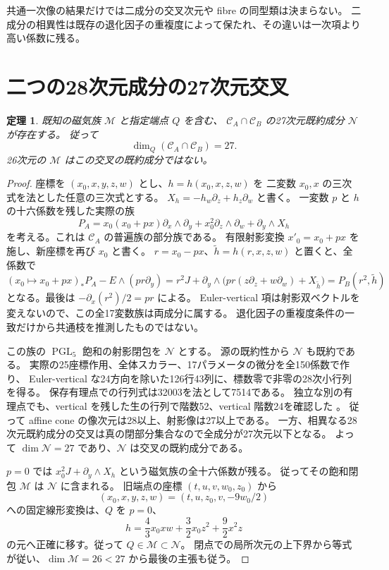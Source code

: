 \documentclass[11pt,a4paper]{ltjsarticle}
\DeclareMathOperator{\PGL}{PGL}
\newtheorem{theorem}{定理}[section]
\theoremstyle{remark}
\begin{document}
共通一次像の結果だけでは二成分の交叉次元や fibre の同型類は決まらない。
二成分の相異性は既存の退化因子の重複度によって保たれ、その違いは一次項より高い係数に残る。

\section{二つの28次元成分の27次元交叉}\label{sec:ambient-intersection27}

\begin{theorem}\label{thm:ambient-intersection27}
既知の磁気族 $\mathcal M$ と指定端点 $Q$ を含む、
$\mathcal C_A\cap\mathcal C_B$ の27次元既約成分 $\mathcal N$ が存在する。
従って
\[
 \dim_Q(\mathcal C_A\cap\mathcal C_B)=27.
\]
26次元の $\mathcal M$ はこの交叉の既約成分ではない。
\end{theorem}
\begin{proof}
座標を $(x_0,x,y,z,w)$ とし、$h=h(x_0,x,z,w)$ を
二変数 $x_0,x$ の三次式を法とした任意の三次式とする。
$X_h=-h_w\partial_z+h_z\partial_w$ と書く。
一変数 $p$ と $h$ の十六係数を残した実際の族
\[
 P_A=x_0(x_0+px)\partial_x\wedge\partial_y
       +x_0^2\partial_z\wedge\partial_w+\partial_y\wedge X_h
\]
を考える。これは $\mathcal C_A$ の普遍族の部分族である。
有限射影変換 $x'_0=x_0+px$ を施し、新座標を再び $x_0$ と書く。
$r=x_0-px$、$\widetilde h=h(r,x,z,w)$ と置くと、全係数で
\[
 (x_0\mapsto x_0+px)_*P_A-E\wedge(pr\partial_y)
 =r^2J+\partial_y\wedge\bigl(pr(z\partial_z+w\partial_w)+X_{\widetilde h}\bigr)
 =P_B(r^2,\widetilde h)
\]
となる。最後は $-\partial_x(r^2)/2=pr$ による。
Euler-vertical 項は射影双ベクトルを変えないので、この全17変数族は両成分に属する。
退化因子の重複度条件の一致だけから共通枝を推測したものではない。

この族の $\PGL_5$ 飽和の射影閉包を $\mathcal N$ とする。
源の既約性から $\mathcal N$ も既約である。
実際の25座標作用、全体スカラー、17パラメータの微分を全150係数で作り、
Euler-vertical な24方向を除いた126行43列に、標数零で非零の28次小行列を得る。
保存有理点での行列式は32003を法として7514である。
独立な別の有理点でも、vertical を残した生の行列で階数52、vertical 階数24を確認した
\cite{ambient-intersection27-v62,ambient-intersection27-review-v62}。
従って affine cone の像次元は28以上、射影像は27以上である。
一方、相異なる28次元既約成分の交叉は真の閉部分集合なので全成分が27次元以下となる。
よって $\dim\mathcal N=27$ であり、$\mathcal N$ は交叉の既約成分である。

$p=0$ では $x_0^2J+\partial_y\wedge X_h$ という磁気族の全十六係数が残る。
従ってその飽和閉包 $\mathcal M$ は $\mathcal N$ に含まれる。
旧端点の座標 $(t,u,v,w_0,z_0)$ から
\[
 (x_0,x,y,z,w)=(t,u,z_0,v,-9w_0/2)
\]
への固定線形変換は、$Q$ を $p=0$、
\[
 h=\frac43x_0xw+\frac32x_0z^2+\frac92x^2z
\]
の元へ正確に移す。従って $Q\in\mathcal M\subset\mathcal N$。
閉点での局所次元の上下界から等式が従い、$\dim\mathcal M=26<27$ から最後の主張も従う。
\end{proof}
\end{document}
